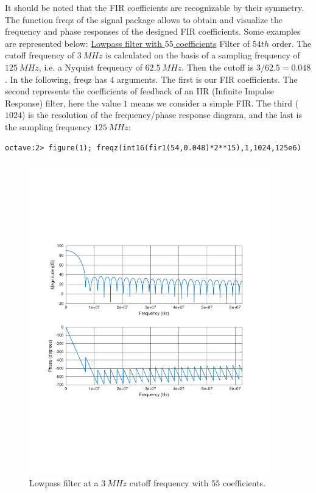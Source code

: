 \documentclass[12pt,oneside]{article}
\begin{document}
It should be noted that the FIR coefficients are recognizable by their symmetry. The function freqz of the signal package allows to obtain and visualize the frequency and phase responses of the designed FIR coefficients. Some examples are represented below:
\newline\newline
\underline{Lowpass filter with $55$ coefficients}\newline\newline
Filter of $54th$ order. The cutoff frequency of $3~MHz$ is calculated on the basis of a sampling frequency of $125~MHz$, i.e. a Nyquist frequency of $62.5~MHz$. Then the cutoff is $3/62.5=0.048$. In the following, freqz has $4$ arguments. The first is our FIR coefficients. The second represents the coefficients of feedback of an IIR (Infinite Impulse Response) filter, here the value $1$ means we consider a simple FIR. The third ($1024$) is the resolution of the frequency/phase response diagram, and the last is the sampling frequency $125~MHz$:

\vspace{-0.1cm}
\begin{lstlisting}
octave:2> figure(1); freqz(int16(fir1(54,0.048)*2**15),1,1024,125e6)
\end{lstlisting}
\vspace{-0cm}

\begin{figure}[!h!tb]
	\begin{center}
		\includegraphics[width=10.5cm,trim={1.5cm 6.9cm 1.5cm 7cm}, clip]{curves/lp55co.pdf}
		\caption{Lowpass filter at a $3~MHz$ cutoff frequency with $55$ coefficients.}
		\label{curv:LP}
	\end{center}
\end{figure}
\end{document}
